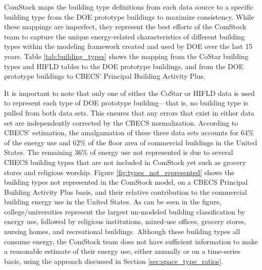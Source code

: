 ComStock maps the building type definitions from each data source to a specific building type from the DOE prototype buildings to maximize consistency. While these mappings are imperfect, they represent the best efforts of the ComStock team to capture the unique energy-related characteristics of different building types within the modeling framework created and used by DOE over the last 15 years. Table \ref{tab:building_types} shows the mapping from the CoStar building types and HIFLD tables to the DOE prototype buildings, and from the DOE prototype buildings to CBECS' Principal Building Activity Plus.



It is important to note that only one of either the CoStar or HIFLD data is used to represent each type of DOE prototype building---that is, no building type is pulled from both data sets. This ensures that any errors that exist in either data set are independently corrected by the CBECS normalization. According to CBECS' estimation, the amalgamation of these three data sets accounts for 64\% of the energy use and 62\% of the floor area of commercial buildings in the United States. The remaining 36\% of energy use not represented is due to several CBECS building types that are not included in ComStock yet such as grocery stores and religious worship. Figure \ref{fig:types_not_represented} shows the building types not represented in the ComStock model, on a CBECS Principal Building Activity Plus basis, and their relative contribution to the commercial building energy use in the United States. As can be seen in the figure, college/universities represent the largest un-modeled building classification by energy use, followed by religious institutions, mixed-use offices, grocery stores, nursing homes, and recreational buildings. Although these building types all consume energy, the ComStock team does not have sufficient information to make a reasonable estimate of their energy use, either annually or on a time-series basis, using the approach discussed in Section \ref{sec:space_type_ratios}.

